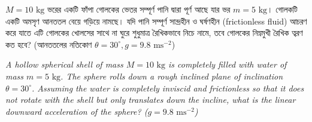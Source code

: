 \documentclass[12pt, a4paper]{article}
\begin{document}
\begin{tcolorbox}[questionbox={প্রশ্ন (Question) 41}]
    \noindent
    $M = 10\text{ kg}$ ভরের একটি ফাঁপা গোলকের ভেতর সম্পূর্ণ পানি দ্বারা পূর্ণ আছে যার ভর $m = 5\text{ kg}$। গোলকটি একটি অমসৃণ আনততল বেয়ে গড়িয়ে নামছে। যদি পানি সম্পূর্ণ সান্দ্রহীন ও ঘর্ষণহীন (frictionless fluid) আচরণ করে যাতে এটি গোলকের খোলসের সাথে না ঘুরে শুধুমাত্র রৈখিকভাবে নিচে নামে, তবে গোলকের নিম্নমুখী রৈখিক ত্বরণ কত হবে? (আনততলের নতিকোণ $\theta = 30^\circ, g = 9.8\text{ ms}^{-2}$)
    
    \vspace{0.8em}
    \begin{english}
    \noindent\textit{\color{darkgray}
    A hollow spherical shell of mass $M = 10\text{ kg}$ is completely filled with water of mass $m = 5\text{ kg}$. The sphere rolls down a rough inclined plane of inclination $\theta = 30^\circ$. Assuming the water is completely inviscid and frictionless so that it does not rotate with the shell but only translates down the incline, what is the linear downward acceleration of the sphere? ($g = 9.8\text{ ms}^{-2}$)
    }
    \end{english}
\end{tcolorbox}
\end{document}
